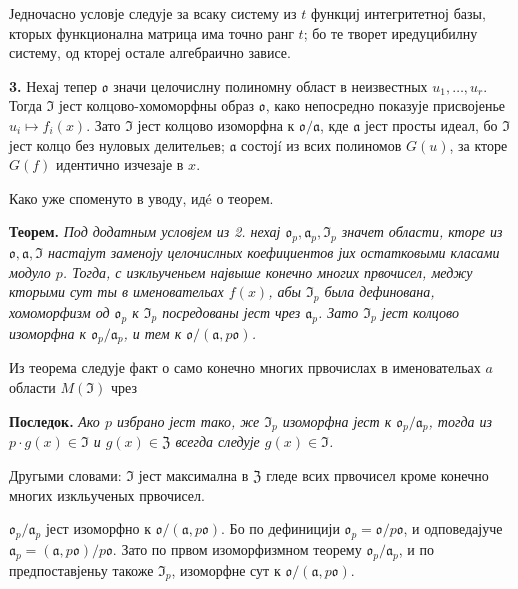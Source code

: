 \documentclass[11pt]{article}
\begin{document}
Једночасно условје следује за всаку систему из \(t\) функциј интегритетној базы, кторых функционална матрица има точно ранг \(t\); бо те творет иредуцибилну систему, од ктореј остале алгебраично зависе.

\medskip\noindent\textbf{3.}
Нехај тепер \(\mathfrak{o}\) значи целочислну полиномну област в неизвестных \(u_1,\ldots,u_r\). Тогда \(\mathfrak{I}\) јест колцово-хомоморфны образ \(\mathfrak{o}\), како непосредно показује присвојенье \(u_i\mapsto f_i(x)\). Зато \(\mathfrak{I}\) јест колцово изоморфна к \(\mathfrak{o}/\mathfrak{a}\), кде \(\mathfrak{a}\) јест просты идеал, бо \(\mathfrak{I}\) јест колцо без нуловых делительев; \(\mathfrak{a}\) состојí из всих полиномов \(G(u)\), за кторе \(G(f)\) идентично изчезаје в \(x\).

Како уже споменуто в уводу, идé о теорем.

\medskip\noindent\textbf{Теорем.}
\textit{Под додатным условјем из 2. нехај \(\mathfrak{o}_p,\mathfrak{a}_p,\mathfrak{I}_p\) значет области, кторе из \(\mathfrak{o},\mathfrak{a},\mathfrak{I}\) настајут заменоју целочислных коефициентов јих остатковыми класами модуло \(p\). Тогда, с изкльученьем највыше конечно многих првочисел, меджу кторыми сут ты в именовательах \(f(x)\), абы \(\mathfrak{I}_p\) была дефинована, хомоморфизм од \(\mathfrak{o}_p\) к \(\mathfrak{I}_p\) посредованы јест чрез \(\mathfrak{a}_p\). Зато \(\mathfrak{I}_p\) јест колцово изоморфна к \(\mathfrak{o}_p/\mathfrak{a}_p\), и тем к \(\mathfrak{o}/(\mathfrak{a},p\mathfrak{o})\).}

Из теорема следује факт о само конечно многих првочислах в именовательах \(a\) области \(M(\mathfrak{I})\) чрез

\medskip\noindent\textbf{Последок.}
\textit{Ако \(p\) избрано јест тако, же \(\mathfrak{I}_p\) изоморфна јест к \(\mathfrak{o}_p/\mathfrak{a}_p\), тогда из \(p\cdot g(x)\in\mathfrak{I}\) и \(g(x)\in\mathfrak{Z}\) всегда следује \(g(x)\in\mathfrak{I}\).}

Другыми словами: \(\mathfrak{I}\) јест максимална в \(\mathfrak{Z}\) гледе всих првочисел кроме конечно многих изкльученых првочисел.

\(\mathfrak{o}_p/\mathfrak{a}_p\) јест изоморфно к \(\mathfrak{o}/(\mathfrak{a},p\mathfrak{o})\). Бо по дефиницији \(\mathfrak{o}_p=\mathfrak{o}/p\mathfrak{o}\), и одповедајуче \(\mathfrak{a}_p=(\mathfrak{a},p\mathfrak{o})/p\mathfrak{o}\). Зато по првом изоморфизмном теорему \(\mathfrak{o}_p/\mathfrak{a}_p\), и по предпоставјеньу такоже \(\mathfrak{I}_p\), изоморфне сут к \(\mathfrak{o}/(\mathfrak{a},p\mathfrak{o})\).
\end{document}
